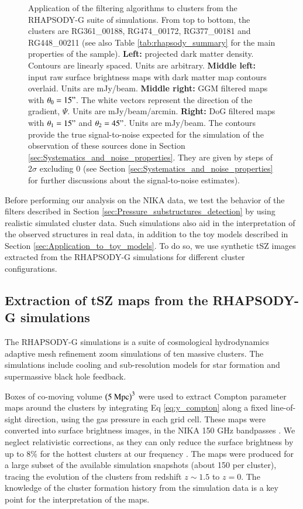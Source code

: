 \documentclass[twocolumn,traditabstract]{aa}
\begin{document}
\begin{figure}[h]
\caption{\footnotesize{Application of the filtering algorithms to clusters from the RHAPSODY-G suite of simulations. From top to bottom, the clusters are RG361\_00188, RG474\_00172, RG377\_00181 and RG448\_00211 (see also Table \ref{tab:rhapsody_summary} for the main properties of the sample). {\bf Left:} projected dark matter density. Contours are linearly spaced. Units are arbitrary. {\bf Middle left:} input raw surface brightness maps with dark matter map contours overlaid. Units are mJy/beam. {\bf Middle right:} GGM filtered maps with $\theta_0 = 15"$. The white vectors represent the direction of the gradient, $\Psi$. Units are mJy/beam/arcmin. {\bf Right:} DoG filtered maps with $\theta_1 = 15"$ and $\theta_2 = 45"$. Units are mJy/beam. The contours provide the true signal-to-noise expected for the simulation of the observation of these sources done in Section \ref{sec:Systematics_and_noise_properties}. They are given by steps of $2 \sigma$ excluding 0 (see Section \ref{sec:Systematics_and_noise_properties} for further discussions about the signal-to-noise estimates).}}
\label{fig:RG_cluster_sample}
\end{figure}

Before performing our analysis on the NIKA data, we test the behavior of the filters described in Section \ref{sec:Pressure_substructures_detection} by using realistic simulated cluster data. Such simulations also aid in the interpretation of the observed structures in real data, in addition to the toy models described in Section \ref{sec:Application_to_toy_models}. To do so, we use synthetic tSZ images extracted from the RHAPSODY-G simulations for different cluster configurations.

\subsection{Extraction of tSZ maps from the RHAPSODY-G simulations}
The RHAPSODY-G simulations \citep{Wu2013,Hahn2017} is a suite of cosmological hydrodynamics adaptive mesh refinement zoom simulations of ten massive clusters. The simulations include cooling and sub-resolution models for star formation and supermassive black hole feedback. 

Boxes of co-moving volume $\left(5 \ {\rm Mpc}\right)^3$ were used to extract Compton parameter maps around the clusters by integrating Eq \ref{eq:y_compton} along a fixed line-of-sight direction, using the gas pressure in each grid cell. These maps were converted into surface brightness images, in the NIKA 150 GHz bandpasses \citep[see the coefficient provided in][]{Adam2016b}. We neglect relativistic corrections, as they can only reduce the surface brightness by up to 8\% for the hottest clusters at our frequency \citep{Itoh2003}. The maps were produced for a large subset of the available simulation snapshots (about 150 per cluster), tracing the evolution of the clusters from redshift $z \sim 1.5$ to $z=0$. The knowledge of the cluster formation history from the simulation data is a key point for the interpretation of the maps.
\end{document}
